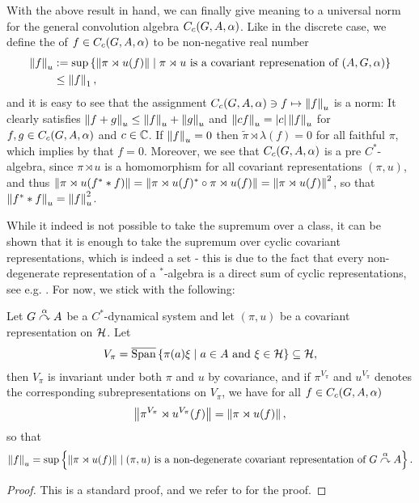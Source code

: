 With the above result in hand, we can finally give meaning to a universal norm for the general convolution algebra $C_c(G,A,\alpha)$. Like in the discrete case, we define the  of $f \in C_c(G,A,\alpha)$ to be non-negative real number
\begin{align*}
\left\lVert f \right\rVert_u &:= \sup\left\{ \left\lVert \pi \rtimes u (f)\right\rVert \mid  \pi \rtimes u \text{ is a covariant represenation of }(A,G ,\alpha) \right\}\\
&\leq \left\lVert f \right\rVert_1,
\end{align*}
and it is easy to see that the assignment $C_c(G,A,\alpha) \ni f \mapsto \left\lVert f \right\rVert_u$ is a norm: It clearly satisfies $\left\lVert f + g \right\rVert_u \leq \left\lVert f \right\rVert_u + \left\lVert g \right\rVert_u$ and $\left\lVert cf \right\rVert_u = |c| \left\lVert f \right\rVert_u$ for $f,g \in C_c(G,A,\alpha)$ and $c \in \mathbb{C}$. If $\left\lVert f \right\rVert_u = 0$ then $\tilde{\pi} \rtimes \lambda (f) = 0$ for all faithful $\pi$, which implies by  that $f = 0$. Moreover, we see that $C_c(G,A,\alpha)$ is a pre $C^*$-algebra, since $\pi \rtimes u$ is a homomorphism for all covariant representations $(\pi,u)$, and thus $\left\lVert \pi \rtimes u (f^*\ast f)\right\rVert = \left\lVert \pi \rtimes u(f)^* \circ \pi \rtimes u(f)\right\rVert = \left\lVert \pi \rtimes u (f)\right\rVert^2$, so that $\left\lVert f^* \ast f\right\rVert_u = \left\lVert f \right\rVert_u^2$. 
\begin{note}
While it indeed is not possible to take the supremum over a class, it can be shown that it is enough to take the supremum over cyclic covariant representations, which is indeed a set - this is due to the fact that every non-degenerate representation of a $^*$-algebra is a direct sum of cyclic representations, see e.g. \cite[Theorem 5.1.3]{murphy2014c}. For now, we stick with the following:
\end{note}
\begin{lemma}
Let $G \stackrel{\alpha}{\curvearrowright} A$ be a $C^*$-dynamical system and let $(\pi,u)$ be a covariant representation on $\mathcal{H}$. Let 
\begin{align*}
	V_\pi = \overline {\mathrm{Span}}\left\{ \pi(a) \xi \mid a \in A \text{ and } \xi \in \mathcal{H} \right\} \subseteq \mathcal{H},
\end{align*}
then $V_\pi$ is invariant under both $\pi$ and $u$ by covariance, and if $\pi^{V_\pi}$ and $ u^{V_\pi}$ denotes the corresponding subrepresentations on $V_{\pi}$, we have for all $f \in C_c(G,A,\alpha)$ 
\begin{align*}
	\left\lVert \pi ^{V_\pi} \rtimes u^{V_\pi}(f) \right\rVert = \left\lVert \pi \rtimes u (f) \right\rVert,
\end{align*}
so that
\begin{align*}
	\left\lVert f \right\rVert_u = \sup\left\{ \left\lVert \pi \rtimes u(f) \right\rVert \mid  (\pi,u) \text{ is a non-degenerate covariant representation of } G \stackrel{\alpha}{\curvearrowright} A\right\}.
\end{align*}
\label{cross:essnorm}
\end{lemma}
\begin{proof}
This is a standard proof, and we refer to \cite[52]{williamscrossed} for the proof.
\end{proof}


